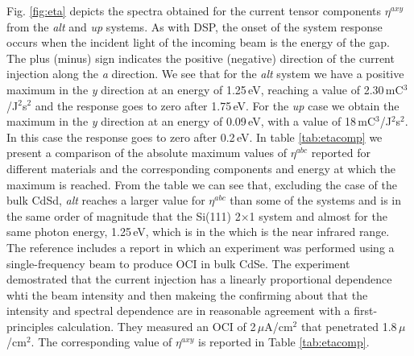 \documentclass[pss]{wiley2sp} %
\begin{document}
Fig. \ref{fig:eta} depicts the spectra obtained for the current tensor components $\eta^{axy}$ from the \emph{alt} and \emph{up} systems. As with DSP, the onset of the system response occurs when the incident light of the incoming beam is the energy of the gap. The plus (minus) sign indicates the positive (negative) direction of the current injection along the \emph{a} direction. We see that for the \emph{alt} system we have a positive maximum in the \emph{y} direction at an energy of 1.25\,eV, reaching a value of 2.30\,mC$^{3}$/J$^{2}$s$^{2}$ and the response goes to zero after 1.75\,eV. For the \emph{up} case we obtain the maximum in the \emph{y} direction at an energy of 0.09\,eV, with a value of 18\,mC$^{3}$/J$^{2}$s$^{2}$. In this case the response goes to zero after 0.2\,eV. In table \ref{tab:etacomp} we present a comparison of the absolute maximum values of $\eta^{abc}$ reported for different materials and the corresponding components and energy at which the maximum is reached. From the table we can see that, excluding the case of the bulk CdSd, \emph{alt} reaches a larger value for $\eta^{abc}$ than some of the systems and is in the same order of magnitude that the Si(111) 2$\times$1 system and almost for the same photon energy, 1.25\,eV, which is in the which is the near infrared range.
The reference \cite{lamanAPL99} includes a report in which an experiment was performed using a single-frequency beam to produce OCI in bulk CdSe. The experiment demostrated that the current injection has a  linearly proportional dependence whti the beam intensity and then makeing the confirming about that the intensity and spectral dependence are in reasonable agreement with a first-principles calculation. They measured an OCI of 2\,$\mu$A/cm$^{2}$ that penetrated 1.8\,$\mu$/cm$^{2}$. The corresponding value of $\eta^{axy}$ is reported in Table \ref{tab:etacomp}.
\end{document}

